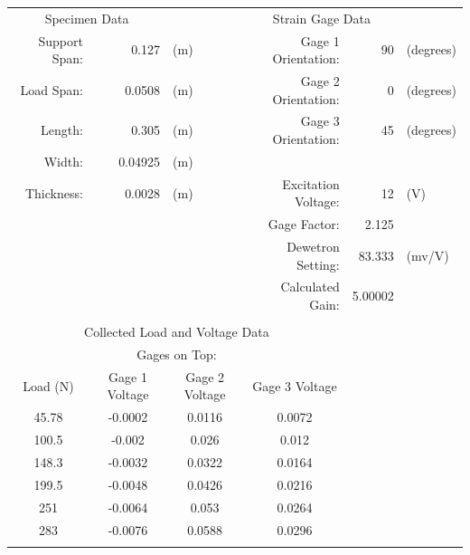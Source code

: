 \documentclass[12pt]{article}
\begin{document}
\begin{table} [h]
	\centering
	\begin{tabular}{ccccrr}
		\multicolumn{2}{c}{Specimen Data} &       & \multicolumn{2}{c}{Strain Gage Data} &  \\
		\cmidrule{1-2}\cmidrule{4-5}    \multicolumn{1}{r}{Support Span:} & \multicolumn{1}{r}{0.127} & \multicolumn{1}{l}{(m)} & \multicolumn{1}{r}{Gage 1 Orientation:} & 90    & \multicolumn{1}{l}{(degrees)} \\
		\multicolumn{1}{r}{Load Span:} & \multicolumn{1}{r}{0.0508} & \multicolumn{1}{l}{(m)} & \multicolumn{1}{r}{Gage 2 Orientation:} & 0     & \multicolumn{1}{l}{(degrees)} \\
		\multicolumn{1}{r}{Length:} & \multicolumn{1}{r}{0.305} & \multicolumn{1}{l}{(m)} & \multicolumn{1}{r}{Gage 3 Orientation:} & 45    & \multicolumn{1}{l}{(degrees)} \\
		\multicolumn{1}{r}{Width:} & \multicolumn{1}{r}{0.04925} & \multicolumn{1}{l}{(m)} &       &       &  \\
		\multicolumn{1}{r}{Thickness:} & \multicolumn{1}{r}{0.0028} & \multicolumn{1}{l}{(m)} & \multicolumn{1}{r}{Excitation Voltage:} & 12    & \multicolumn{1}{l}{(V)} \\
		&       &       & \multicolumn{1}{r}{Gage Factor:} & 2.125 &  \\
		&       &       & \multicolumn{1}{r}{Dewetron Setting:} & 83.333 & \multicolumn{1}{l}{(mv/V)} \\
		&       &       & \multicolumn{1}{r}{Calculated Gain:} & 5.00002 &  \\
		&       &       &       &       &  \\
		\multicolumn{4}{c}{Collected Load and Voltage Data} &       &  \\
		\cmidrule{1-4}    \multicolumn{4}{c}{Gages on Top:} &       &  \\
		Load (N) & Gage 1 Voltage & Gage 2 Voltage & Gage 3 Voltage &       &  \\
		45.78 & -0.0002 & 0.0116 & 0.0072 &       &  \\
		100.5 & -0.002 & 0.026 & 0.012 &       &  \\
		148.3 & -0.0032 & 0.0322 & 0.0164 &       &  \\
		199.5 & -0.0048 & 0.0426 & 0.0216 &       &  \\
		251   & -0.0064 & 0.053 & 0.0264 &       &  \\
		283   & -0.0076 & 0.0588 & 0.0296 &       &  \\
		&       &       &       &       &  \\

\end{tabular}
\end{table}
\end{document}
